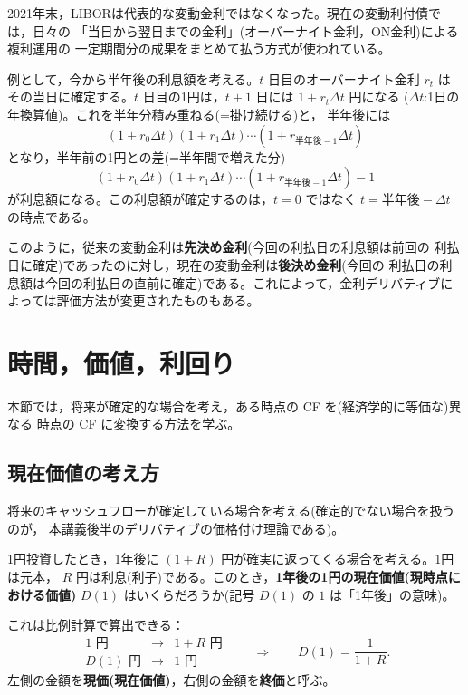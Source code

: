 \begin{remark}[LIBORの廃止と後決め金利]
2021年末，LIBORは代表的な変動金利ではなくなった。現在の変動利付債では，日々の
「当日から翌日までの金利」(オーバーナイト金利，ON金利)による複利運用の
一定期間分の成果をまとめて払う方式が使われている。

例として，今から半年後の利息額を考える。$t$ 日目のオーバーナイト金利 $r_t$ は
その当日に確定する。$t$ 日目の1円は，$t+1$ 日には $1 + r_t \Delta t$ 円になる
($\Delta t$:1日の年換算値)。これを半年分積み重ねる(=掛け続ける)と，
半年後には
\[
(1 + r_0 \Delta t)(1 + r_1 \Delta t) \cdots (1 + r_{\text{半年後}-1} \Delta t)
\]
となり，半年前の1円との差(=半年間で増えた分)
\[
(1 + r_0 \Delta t)(1 + r_1 \Delta t) \cdots (1 + r_{\text{半年後}-1} \Delta t) - 1
\]
が利息額になる。この利息額が確定するのは，$t=0$ ではなく
$t = \text{半年後} - \Delta t$ の時点である。

このように，従来の変動金利は\textbf{先決め金利}(今回の利払日の利息額は前回の
利払日に確定)であったのに対し，現在の変動金利は\textbf{後決め金利}(今回の
利払日の利息額は今回の利払日の直前に確定)である。これによって，金利デリバティブに
よっては評価方法が変更されたものもある。
\end{remark}

\vspace{18pt}

\section{時間，価値，利回り}

本節では，将来が確定的な場合を考え，ある時点の CF を(経済学的に等価な)異なる
時点の CF に変換する方法を学ぶ。

\subsection{現在価値の考え方}

将来のキャッシュフローが確定している場合を考える(確定的でない場合を扱うのが，
本講義後半のデリバティブの価格付け理論である)。

1円投資したとき，1年後に $(1+R)$ 円が確実に返ってくる場合を考える。1円は元本，
$R$ 円は利息(利子)である。このとき，\textbf{1年後の1円の現在価値(現時点に
おける価値)} $D(1)$ はいくらだろうか(記号 $D(1)$ の $1$ は「1年後」の意味)。

これは比例計算で算出できる：
\[
\begin{array}{ccc}
1 \text{ 円} & \longrightarrow & 1+R \text{ 円}\\
D(1) \text{ 円} & \longrightarrow & 1 \text{ 円}
\end{array}
\qquad\Longrightarrow\qquad
D(1) = \frac{1}{1+R}.
\]
左側の金額を\textbf{現価(現在価値)}，右側の金額を\textbf{終価}と呼ぶ。

